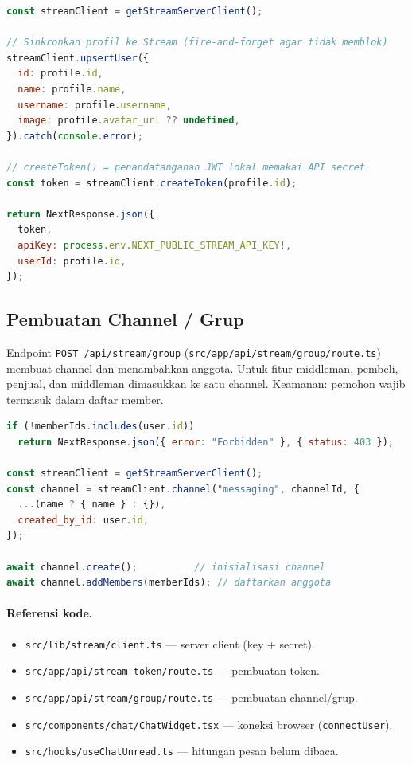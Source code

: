 \begin{lstlisting}[language=JavaScript,caption={Membuat token GetStream (stream-token/route.ts)}]
const streamClient = getStreamServerClient();

// Sinkronkan profil ke Stream (fire-and-forget agar tidak memblok)
streamClient.upsertUser({
  id: profile.id,
  name: profile.name,
  username: profile.username,
  image: profile.avatar_url ?? undefined,
}).catch(console.error);

// createToken() = penandatanganan JWT lokal memakai API secret
const token = streamClient.createToken(profile.id);

return NextResponse.json({
  token,
  apiKey: process.env.NEXT_PUBLIC_STREAM_API_KEY!,
  userId: profile.id,
});
\end{lstlisting}

\subsection{Pembuatan Channel / Grup}
Endpoint \texttt{POST /api/stream/group}
(\texttt{src/app/api/stream/group/route.ts}) membuat channel dan menambahkan
anggota. Untuk fitur middleman, pembeli, penjual, dan middleman dimasukkan ke
satu channel. Keamanan: pemohon wajib termasuk dalam daftar member.

\begin{lstlisting}[language=JavaScript,caption={Membuat channel & menambah member (stream/group/route.ts)}]
if (!memberIds.includes(user.id))
  return NextResponse.json({ error: "Forbidden" }, { status: 403 });

const streamClient = getStreamServerClient();
const channel = streamClient.channel("messaging", channelId, {
  ...(name ? { name } : {}),
  created_by_id: user.id,
});

await channel.create();          // inisialisasi channel
await channel.addMembers(memberIds); // daftarkan anggota
\end{lstlisting}

\paragraph{Referensi kode.}
\begin{itemize}
  \item \texttt{src/lib/stream/client.ts} --- server client (key + secret).
  \item \texttt{src/app/api/stream-token/route.ts} --- pembuatan token.
  \item \texttt{src/app/api/stream/group/route.ts} --- pembuatan channel/grup.
  \item \texttt{src/components/chat/ChatWidget.tsx} --- koneksi browser (\texttt{connectUser}).
  \item \texttt{src/hooks/useChatUnread.ts} --- hitungan pesan belum dibaca.
\end{itemize}


